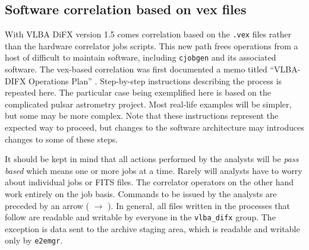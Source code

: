 \subsection{Software correlation based on vex files}

With VLBA DiFX version 1.5 comes correlation based on the {\tt .vex} files rather than the hardware correlator jobs scripts.
This new path frees operations from a host of difficult to maintain software, including {\tt cjobgen} and its associated software.
The vex-based correlation was first documented a memo titled ``VLBA-DIFX Operations Plan'' \cite{opsplan}.
Step-by-step instructions describing the process is repeated here.
The particular case being exemplified here is based on the complicated pulsar astrometry project.
Most real-life examples will be simpler, but some may be more complex.
Note that these instructions represent the expected way to proceed, but changes to the software architecture may introduces changes to some of these steps.

It should be kept in mind that all actions performed by the analysts will be {\em pass based} which means one or more jobs at a time.
Rarely will analysts have to worry about individual jobs or FITS files.
The correlator operators on the other hand work entirely on the job basis.
Commands to be issued by the analysts are preceded by an arrow ( $\longrightarrow$ ).
In general, all files written in the processes that follow are readable and writable by everyone in the {\tt vlba\_difx} group.
The exception is data sent to the archive staging area, which is readable and writable only by {\tt e2emgr}.

